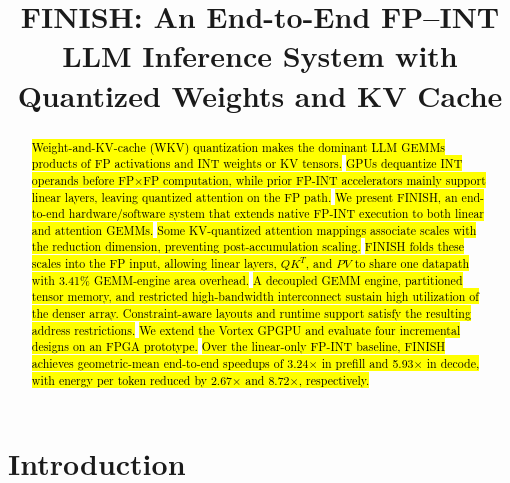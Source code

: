 \documentclass[sigconf,anonymous,nonacm]{acmart}
\title[FINISH: An End-to-End FP--INT LLM Inference System]{FINISH: An End-to-End FP–INT LLM Inference System with Quantized Weights and KV Cache}
\newcommand{\ours}{\textsc{FINISH}}
\newcommand{\fpint}{FP-INT}
\DeclareRobustCommand{\rev}[1]{\hl{#1}}
\begin{document}
\begin{abstract}
\rev{Weight-and-KV-cache (WKV) quantization makes the dominant LLM GEMMs products of FP activations and INT weights or KV tensors.} \rev{GPUs dequantize INT operands before FP$\times$FP computation, while prior \fpint{} accelerators mainly support linear layers, leaving quantized attention on the FP path.} \rev{We present \ours{}, an end-to-end hardware/software system that extends native \fpint{} execution to both linear and attention GEMMs.} \rev{Some KV-quantized attention mappings associate scales with the reduction dimension, preventing post-accumulation scaling.} \rev{\ours{} folds these scales into the FP input, allowing linear layers, $QK^T$, and $PV$ to share one datapath with 3.41\% GEMM-engine area overhead.} \rev{A decoupled GEMM engine, partitioned tensor memory, and restricted high-bandwidth interconnect sustain high utilization of the denser array. Constraint-aware layouts and runtime support satisfy the resulting address restrictions.} \rev{We extend the Vortex GPGPU and evaluate four incremental designs on an FPGA prototype.} \rev{Over the linear-only \fpint{} baseline, \ours{} achieves geometric-mean end-to-end speedups of 3.24$\times$ in prefill and 5.93$\times$ in decode, with energy per token reduced by 2.67$\times$ and 8.72$\times$, respectively.}


\end{abstract}

\maketitle

\section{Introduction}
\end{document}
